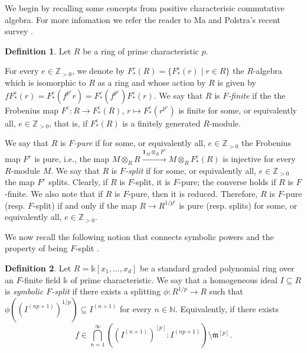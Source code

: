 \documentclass[12pt]{amsart}
\theoremstyle{definition}
\newtheorem{definition}[definition]{Definition}
\newcommand{\m}{\mathfrak{m}}
\renewcommand{\(}{\left(}
\renewcommand{\)}{\right)}
\newcommand{\NN}{\mathbb{N} }
\newcommand{\ZZ}{\mathbb{Z}}
\newcommand{\kk}{\mathbb{k}}
\renewcommand{\!}[1]{{\color{red}\text{\Huge$\star$ }#1}}
\begin{document}
We begin by recalling some concepts from positive characterisic commutative algebra. For more infomation we refer the reader to Ma and Polstra's recent survey \cite{ma2021f}.

\begin{definition}\label{DefFbasic}
Let $R$ be a ring of prime characteristic $p$. 

For every $e\in \ZZ_{> 0}$, we denote by $F^e_*( R)=\{F^e_* (r)\;|\; r\in R\}$ the $R$-algebra which is isomorphic to $R$ as a ring and whose action by $R$ is given by $f F^e_* (r)=F^e_* \left(f^{p^e}r\right)=F^e_*\left(f^{p^e}\right) F^e_* (r)$. %
We say that $R$ is {\it $F$-finite} if the the Frobenius map $F^e:R\to F_*^e(R)$, $r\mapsto F_*^e(r^{p^e})$ is finite for some, or equivalently all, $e\in \ZZ_{> 0}$, that is, if  $F_*^e(R)$ is a finitely generated  $R$-module. 
%

We say that $R$ is  {\it $F$-pure} if for some, or equivalently all, $e\in \ZZ_{>0}$ the Frobenius map $F^e$ is pure, i.e.,  the map $M\otimes_R R\xrightarrow{\mathbf{1}_M\otimes_R F^e} M\otimes_R F_*^e(R)$ is injective for every $R$-module $M$. 
We say that $R$ is {\it $F$-split} if for some, or equivalently all, $e\in \ZZ_{>0}$ the map $ F^e$ splits. 
Clearly, if $R$ is $F$-split, it is $F$-pure; the converse holds if $R$ is $F$-finite. We also note that if $R$ is  $F$-pure, then it is reduced. Therefore, $R$ is $F$-pure (resp. $F$-split) if and only if the map $R\to R^{1/p^e}$ is pure (resp. splits) for   some, or equivalently all, $e\in \ZZ_{>0}$. 
\end{definition}





We now  recall the following notion that connects symbolic powers and the property of being $F$-split \cite{DSMNB}. 

\begin{definition}\label{DefFpureFilt}
 Let $R=\kk [x_1,\ldots,x_d]$ be a standard graded polynomial ring over an $F$-finite  field $\kk$ of prime characteristic. We say that a homogeneous ideal $I\subseteq R$ is  {\it symbolic $F$-split} if  there exists a splitting $\phi:R^{1/p}\to R$ such that
$\phi\left(\left(I^{(np+1)}\right)^{1/p}\right)\subseteq I^{(n+1)}$ for every $n\in \NN$.   
Equivalently, if there exists 
$$f\in \bigcap^{\infty}_{n=1} \left( \left( I^{(n+1)}\right)^{[p]}:I^{(np+1)}\right)\setminus \m^{[p]}.$$
\end{definition}
\end{document}
